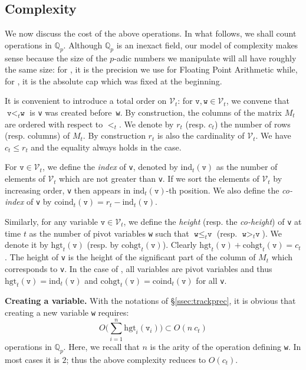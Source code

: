 \documentclass[sigconf]{acmart}
\newcommand{\Q}{\mathbb Q}
\newcommand{\Qp}{\Q_p}
\newcommand{\calV}{\mathcal{V}}
\newcommand{\ttv}{\texttt{v}\xspace}
\newcommand{\ttw}{\texttt{w}\xspace}
\newcommand{\ZpLC}{\text{\color{output} \rm \tt ZpLC}\xspace}
\newcommand{\ZpLF}{\text{\color{output} \rm \tt ZpLF}\xspace}
\newcommand{\ind}{\text{ind}}
\newcommand{\coind}{\text{coind}}
\newcommand{\hgt}{\text{hgt}}
\newcommand{\cohgt}{\text{cohgt}}
\theoremstyle{definition}
\begin{document}
\subsection{Complexity}
\label{ssec:complexity}

We now discuss the cost of the above operations.
In what follows, we shall count operations in $\Qp$. Although $\Qp$
is an inexact field, our model of complexity makes sense because the
size of the $p$-adic numbers we manipulate will all have roughly the
same size: for \ZpLF, it is the precision we use for Floating Point 
Arithmetic while, for \ZpLC, it is the absolute cap which
was fixed at the beginning.

It is convenient to introduce a total order on $\calV_t$: for $\ttv, 
\ttw \in \calV_t$, we convene that $\ttv <_t \ttw$ is \ttv was created 
before~\ttw. By construction, the columns of the matrix $M_t$ are 
ordered with respect to $<_t$. We denote by $r_t$ (resp. $c_t$) the
number of rows (resp. columns) of $M_t$. By construction $r_t$ is
also the cardinality of $\calV_t$. We have $c_t \leq r_t$ and the 
equality always holds in the \ZpLC case.

For $\ttv \in \calV_t$, we define the \emph{index} of \ttv, denoted by 
$\ind_t(\ttv)$ as the number of elements of $\calV_t$ which are not 
greater than \ttv. If we sort the elements of $\calV_t$ by increasing 
order, \ttv then appears in $\ind_t(\ttv)$-th position.
We also define the \emph{co-index} of \ttv by
$\coind_t(\ttv) = r_t - \ind_t(\ttv)$.

Similarly, for any variable $\ttv \in \calV_t$, we define the 
\emph{height} (resp. the \emph{co-height}) of \ttv at time $t$ as the 
number of pivot variables \ttw such that $\ttw \leq_t \ttv$ (resp. 
$\ttw >_t \ttv$). We denote it by $\hgt_t(\ttv)$ (resp. by 
$\cohgt_t(\ttv)$). Clearly $\hgt_t(\ttv) + \cohgt_t(\ttv) = c_t$.
The height of \ttv is the height of the significant 
part of the column of $M_t$ which corresponds to \ttv. In the case of
\ZpLC, all variables are pivot variables and thus $\hgt_t(\ttv) = 
\ind_t(\ttv)$ and $\cohgt_t(\ttv) = \coind_t(\ttv)$ for all \ttv.

\medskip

\noindent \textbf{Creating a variable.}
%
With the notations of \S \ref{ssec:trackprec}, it is obvious that 
creating a new variable \ttw requires:
$$O\bigg(\sum_{i=1}^n \hgt_i(\ttv_i)\bigg) \subset O(n \: c_t)$$ 
operations in $\Qp$. Here, we recall that $n$ is the arity of the 
operation defining \ttw. In most cases it is $2$; thus the above
complexity reduces to $O(c_t)$.
\end{document}
